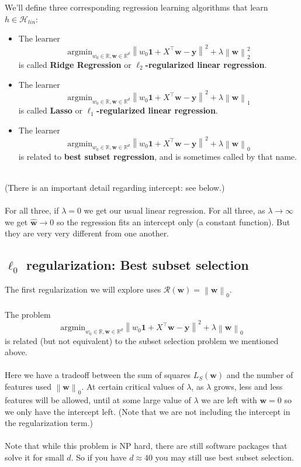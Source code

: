 \documentclass[11pt]{article}
\newcommand{\norm}[1]{\left\| #1\right\|}
\newcommand{\R}{\ensuremath{\mathbb{R}}}
\newcommand{\Tr}{\ensuremath{\top}}
\newcommand{\Rc}{\mathcal{R}}
\newcommand{\Hc}{\mathcal{H}}
\newcommand{\V}[1]{\mathbf{#1}}
\begin{document}
We'll define three corresponding regression learning algorithms that learn $h\in\Hc_{lin}$:
\begin{itemize}
    \item The learner 
    \[
      \text{argmin}_{w_0\in\R,\V{w}\in\R^{d}} \norm{ w_0\mathbf{1} + X^\Tr\V{w} -\V{y}  }^2
+  \lambda \norm{\V{w}}^2_2
    \]
    is called {\bf Ridge Regression} or {\bf $\ell_2$-regularized linear
    regression}.
 \item The learner 
    \[
      \text{argmin}_{w_0\in\R,\V{w}\in\R^{d}} \norm{  w_0\mathbf{1} + X^\Tr\V{w} -\V{y}  }^2
+  \lambda \norm{\V{w}}_1
    \]
    is called {\bf Lasso} or {\bf $\ell_1$-regularized linear
    regression}.
  \item The learner 
    \[
      \text{argmin}_{w_0\in\R,\V{w}\in\R^{d}} \norm{  w_0\mathbf{1} + X^\Tr\V{w} -\V{y}  }^2
+  \lambda \norm{\V{w}}_0
    \]
    is related to {\bf best subset regression}, and is sometimes called by 
    that name.
\end{itemize}
~\\
(There is an important detail regarding intercept: see below.)
\\~\\
For all three, if $\lambda=0$ we get our usual linear regression. 
For all three, as $\lambda \to \infty$ we get $\hat{\V{w}}\to 0$ so the
regression fits an intercept only (a constant function). 
But they are very very different from one another. 

\subsection{$\ell_0$ regularization: Best subset selection}

The first regularization we will explore uses $\Rc(\V{w}) = \norm{\V{w}}_0$.
\\~\\
The problem
 \[
      \text{argmin}_{w_0\in\R,\V{w}\in\R^{d}} \norm{  w_0\mathbf{1} + X^\Tr\V{w} -\V{y}  }^2
+  \lambda \norm{\V{w}}_0
    \]
is related (but not equivalent) to the subset selection problem we mentioned above.
\\~\\
Here we have a tradeoff between the sum of
squares $L_S(\V{w})$ and the number of features used $\norm{\V{w}}_0$. At
certain critical values of $\lambda$, as $\lambda$ grows, less and less
features will be allowed, until at some large value of $\lambda$ we are left
with $\V{w}=0$ so we only have  the intercept left. (Note that we are not
including the intercept in the regularization term.) 
%
%
\\~\\
Note that while this problem is NP hard, there are still software packages that
solve it for small $d$. So if you have $d\approx 40$ you may still use best
subset selection. 
\end{document}
